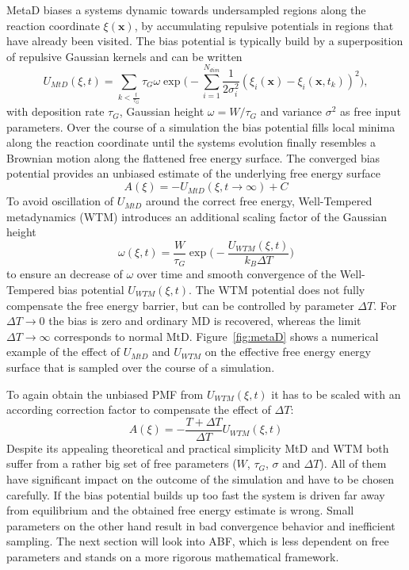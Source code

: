 MetaD biases a systems dynamic towards undersampled regions along the reaction coordinate $\xi(\textbf{x})$, by accumulating repulsive potentials in regions that have already been visited.\autocite{barducci2011metadynamics} The bias potential is typically build by a superposition of repulsive Gaussian kernels and can be written
\begin{equation}
  U_{MtD}(\xi,t)= \sum_{k<\frac{t}{\tau_G}} \tau_G \omega \exp\biggr(-\sum_{i=1}^{N_{dim}} \frac{1}{2\sigma_{i}^{2}} (\xi_{i}(\textbf{x})-\xi_{i}(\textbf{x},t_k))^2 \biggl),
  \label{eq:U_mtD}
\end{equation}
with deposition rate $\tau_G$, Gaussian height $\omega=W/\tau_G$ and variance $\sigma^2$ as free input parameters. Over the course of a simulation the bias potential fills local minima along the reaction coordinate until the systems evolution finally resembles a Brownian motion along the flattened free energy surface. The converged bias potential provides an unbiased estimate of the underlying free energy surface
\begin{equation}
  A(\xi) = -U_{MtD}(\xi, t \to \infty) + C
\end{equation}
To avoid oscillation of $U_{MtD}$ around the correct free energy, Well-Tempered metadynamics (WTM)\autocite{barducci2008well} introduces an additional scaling factor of the Gaussian height
\begin{equation}
  \omega(\xi,t) = \frac{W}{\tau_G}\exp\biggl(-\frac{U_{WTM}(\xi,t)}{k_B \Delta T} \biggr)
  \label{eq:WTM}
\end{equation}
to ensure an decrease of $\omega$ over time and smooth convergence of the Well-Tempered bias potential $U_{WTM}(\xi,t)$. The WTM potential does not fully compensate the free energy barrier, but can be controlled by parameter $\Delta T$. For $\Delta T \to 0$ the bias is zero and ordinary MD is recovered, whereas the limit $\Delta T \to \infty$ corresponds to normal MtD. Figure~\ref{fig:metaD} shows a numerical example of the effect of $U_{MtD}$ and $U_{WTM}$ on the effective free energy energy surface that is sampled over the course of a simulation.

To again obtain the unbiased PMF from $U_{WTM}(\xi,t)$ it has to be scaled with an according correction factor to compensate the effect of $\Delta T$:
\begin{equation}
A(\xi) = -\frac{T+\Delta T}{\Delta T}U_{WTM}(\xi, t)
\end{equation}
Despite its appealing theoretical and practical simplicity MtD and WTM both suffer from a rather big set of free parameters ($W$, $\tau_G$, $\sigma$ and $\Delta T$). All of them have significant impact on the outcome of the simulation and have to be chosen carefully. If the bias potential builds up too fast the system is driven far away from equilibrium and the obtained free energy estimate is wrong. Small parameters on the other hand result in bad convergence behavior and inefficient sampling.\autocite{laio2005assessing}
The next section will look into ABF, which is less dependent on free parameters and stands on a more rigorous mathematical framework.

